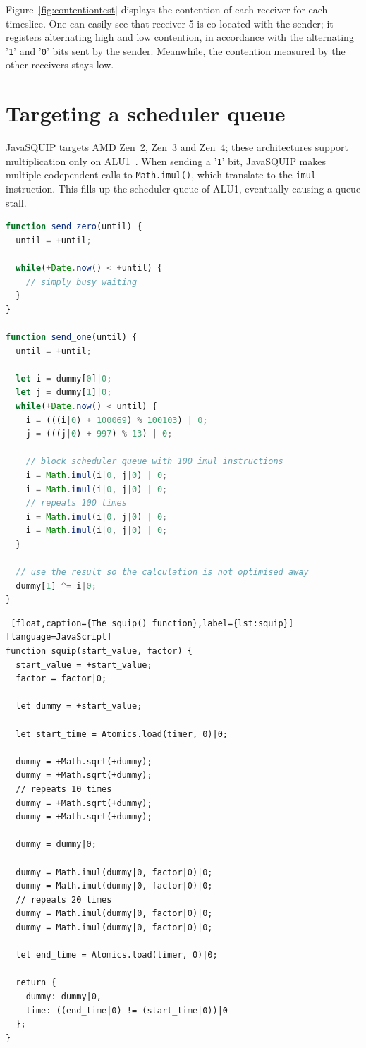 \documentclass[11pt,
  titlepage=false,
  parskip=half,      %
]{scrreprt}
\begin{document}
Figure~\ref{fig:contentiontest} displays the contention of each receiver for each timeslice.
One can easily see that receiver 5 is co-located with the sender;
it registers alternating high and low contention, in accordance with the alternating '\texttt{1}' and '\texttt{0}' bits sent by the sender.
Meanwhile, the contention measured by the other receivers stays low.

\section{Targeting a scheduler queue}
JavaSQUIP targets AMD Zen~2, Zen~3 and Zen~4;
these architectures support multiplication only on ALU1~\cite{AMD2020OptimizationEPYC7003}.
When sending a '\texttt{1}' bit, JavaSQUIP makes multiple codependent calls to \texttt{Math.imul()}, which translate to the \texttt{imul} instruction.
This fills up the scheduler queue of ALU1, eventually causing a queue stall.

\begin{lstlisting}[float,caption={The functions \texttt{send\_zero()} and \texttt{send\_one()}},label={lst:sendzeroone},language=JavaScript]
function send_zero(until) {
  until = +until;

  while(+Date.now() < +until) {
    // simply busy waiting
  }
}

function send_one(until) {
  until = +until;

  let i = dummy[0]|0;
  let j = dummy[1]|0;
  while(+Date.now() < until) {
    i = (((i|0) + 100069) % 100103) | 0;
    j = (((j|0) + 997) % 13) | 0;

    // block scheduler queue with 100 imul instructions
    i = Math.imul(i|0, j|0) | 0;
    i = Math.imul(i|0, j|0) | 0;
    // repeats 100 times
    i = Math.imul(i|0, j|0) | 0;
    i = Math.imul(i|0, j|0) | 0;
  }

  // use the result so the calculation is not optimised away
  dummy[1] ^= i|0;
}
\end{lstlisting}

\begin{lstlisting} [float,caption={The squip() function},label={lst:squip}][language=JavaScript]
function squip(start_value, factor) {
  start_value = +start_value;
  factor = factor|0;

  let dummy = +start_value;

  let start_time = Atomics.load(timer, 0)|0;

  dummy = +Math.sqrt(+dummy);
  dummy = +Math.sqrt(+dummy);
  // repeats 10 times
  dummy = +Math.sqrt(+dummy);
  dummy = +Math.sqrt(+dummy);

  dummy = dummy|0;

  dummy = Math.imul(dummy|0, factor|0)|0;
  dummy = Math.imul(dummy|0, factor|0)|0;
  // repeats 20 times
  dummy = Math.imul(dummy|0, factor|0)|0;
  dummy = Math.imul(dummy|0, factor|0)|0;

  let end_time = Atomics.load(timer, 0)|0;

  return {
    dummy: dummy|0,
    time: ((end_time|0) != (start_time|0))|0
  };
}
\end{lstlisting}
\end{document}
